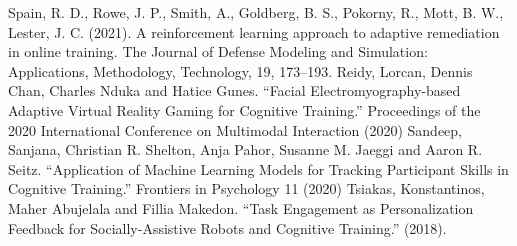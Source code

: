 \documentclass{article}
\begin{document}
\begin{thebibliography}{99}
        Spain, R. D., Rowe, J. P., Smith, A., Goldberg, B. S., Pokorny, R., Mott, B. W., Lester, J. C. (2021). A reinforcement learning approach to adaptive remediation in online training. The Journal of Defense Modeling and Simulation: Applications, Methodology, Technology, 19, 173–193. 
        Reidy, Lorcan, Dennis Chan, Charles Nduka and Hatice Gunes. “Facial Electromyography-based Adaptive Virtual Reality Gaming for Cognitive Training.” Proceedings of the 2020 International Conference on Multimodal Interaction (2020)
        Sandeep, Sanjana, Christian R. Shelton, Anja Pahor, Susanne M. Jaeggi and Aaron R. Seitz. “Application of Machine Learning Models for Tracking Participant Skills in Cognitive Training.” Frontiers in Psychology 11 (2020)
        Tsiakas, Konstantinos, Maher Abujelala and Fillia Makedon. “Task Engagement as Personalization Feedback for Socially-Assistive Robots and Cognitive Training.” (2018).      
        
    \end{thebibliography}
\end{document}

